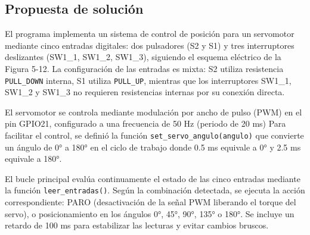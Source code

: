 \documentclass[letterpaper,12pt]{article}
\begin{document}
\newpage

\subsection*{Propuesta de solución}
El programa implementa un sistema de control de posición para un servomotor mediante cinco entradas digitales: dos pulsadores (S2 y S1) y tres interruptores deslizantes (SW1\_1, SW1\_2, SW1\_3), siguiendo el esquema eléctrico de la Figura 5-12. La configuración de las entradas es mixta: S2 utiliza resistencia \texttt{PULL\_DOWN} interna, S1 utiliza \texttt{PULL\_UP}, mientras que los interruptores SW1\_1, SW1\_2 y SW1\_3 no requieren resistencias internas por su conexión directa.

El servomotor se controla mediante modulación por ancho de pulso (PWM) en el pin GPIO21, configurado a una frecuencia de 50 Hz (periodo de 20 ms) Para facilitar el control, se definió la función \texttt{set\_servo\_angulo(angulo)} que convierte un ángulo de 0° a 180° en el ciclo de trabajo  donde 0.5 ms  equivale a 0° y 2.5 ms equivale a 180°.

El bucle principal evalúa continuamente el estado de las cinco entradas mediante la función \texttt{leer\_entradas()}. Según la combinación detectada, se ejecuta la acción correspondiente: PARO (desactivación de la señal PWM liberando el torque del servo), o posicionamiento en los ángulos 0°, 45°, 90°, 135° o 180°. Se incluye un retardo de 100 ms para estabilizar las lecturas y evitar cambios bruscos.
\end{document}
